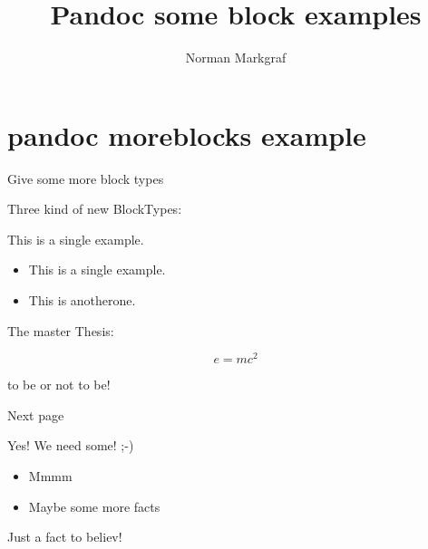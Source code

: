 \documentclass[10pt,english,ignorenonframetext,]{beamer}
\title{Pandoc some block examples}
\author{Norman Markgraf}
\date{}
\providecommand{\tightlist}{%
  \setlength{\itemsep}{0pt}\setlength{\parskip}{0pt}}
\begin{document}
\frame{\titlepage}

\section{pandoc moreblocks example}\label{pandoc-moreblocks-example}

\begin{frame}{Give some more block types}

Three kind of new BlockTypes:

\begin{Beispiel}\label{one-example}

This is a single example.

\end{Beispiel}

\begin{examples}\label{a-couple-of-examples}

\begin{itemize}
\tightlist
\item
  This is a single example.
\item
  This is anotherone.
\end{itemize}

\end{examples}

\begin{definition}\label{a-definition-block}

The master Thesis:

\begin{equation*}
    e=mc^2
\end{equation*}

to be or not to be!

\end{definition}

\end{frame}

\begin{frame}{Next page}

\begin{theorem}[A Theorem]\label{a-theorem}

Yes! We need some! ;-)

\end{theorem}

\begin{Fakten}\label{some-facts}

\begin{itemize}
\tightlist
\item
  Mmmm
\item
  Maybe some more facts
\end{itemize}

\end{Fakten}

\begin{Fakt}[A fact]\label{a-fact}

Just a fact to believ!

\end{Fakt}

\end{frame}
\end{document}
